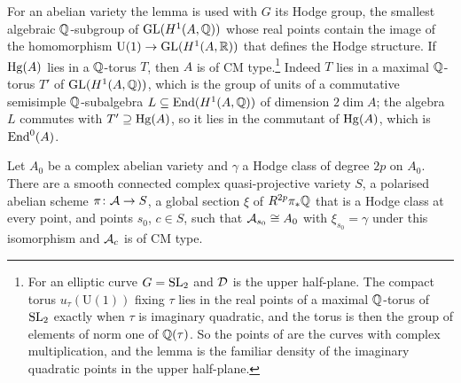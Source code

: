 For an abelian variety the lemma is used with $G$ its Hodge group, the
smallest algebraic $\mathbb{Q}$-subgroup of $\operatorname{GL}(H^{1}(A,\mathbb{Q}))$ whose real points
contain the image of the homomorphism $\mathrm{U}(1)\to\operatorname{GL}(H^{1}(A,\mathbb{R}))$
that defines the Hodge structure. If $\operatorname{Hg}(A)$ lies in a $\mathbb{Q}$-torus $T$, then
$A$ is of CM type.\footnote{For an elliptic curve $G=\operatorname{SL}_{2}$ and $\mathcal{D}$ is
the upper half-plane. The compact torus $u_{\tau}(\mathrm{U}(1))$ fixing
$\tau$ lies in the real points of a maximal $\mathbb{Q}$-torus of $\operatorname{SL}_{2}$ exactly
when $\tau$ is imaginary quadratic, and the torus is then the group of
elements of norm one of $\mathbb{Q}(\tau)$. So the points of 
are the curves with complex multiplication, and the lemma is the familiar
density of the imaginary quadratic points in the upper half-plane.} Indeed $T$ lies in a maximal $\mathbb{Q}$-torus $T'$ of
$\operatorname{GL}(H^{1}(A,\mathbb{Q}))$, which is the group of units of a commutative semisimple
$\mathbb{Q}$-subalgebra $L\subseteq\operatorname{End}(H^{1}(A,\mathbb{Q}))$ of dimension $2\dim A$; the
algebra $L$ commutes with $T'\supseteq\operatorname{Hg}(A)$, so it lies in the commutant of
$\operatorname{Hg}(A)$, which is $\operatorname{End}^{0}(A)$.

\begin{proposition}\label{prop:cmfamily}
Let $A_{0}$ be a complex abelian variety and $\gamma$ a Hodge class of degree
$2p$ on $A_{0}$. There are a smooth connected complex quasi-projective variety
$S$, a polarised abelian scheme $\pi\colon\mathcal{A}\to S$, a global section $\xi$ of
$R^{2p}\pi_{*}\mathbb{Q}$ that is a Hodge class at every point, and points $s_{0}$,
$c\in S$, such that $\mathcal{A}_{s_{0}}\cong A_{0}$ with $\xi_{s_{0}}=\gamma$ under
this isomorphism and $\mathcal{A}_{c}$ is of CM type.
\end{proposition}

